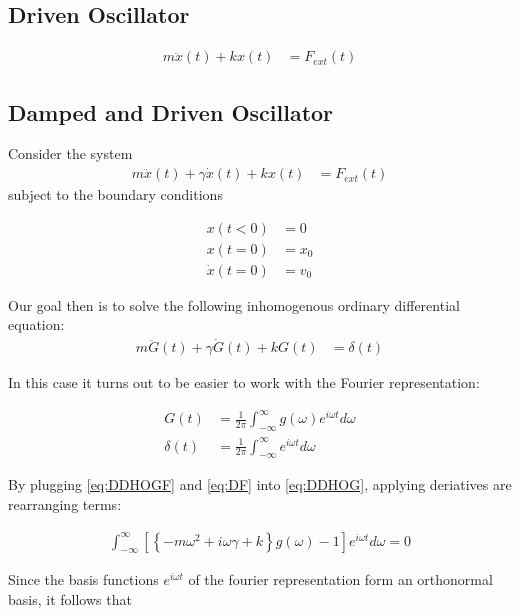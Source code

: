 \documentclass[11pt]{article}
\theoremstyle{plain}
\theoremstyle{definition}
\begin{document}
\subsection{Driven Oscillator}
\begin{align}
    m \ddot x(t) + kx(t) &= F_{ext}(t)
\end{align}


\subsection{Damped and Driven  Oscillator}

Consider the system
\begin{align}
    m \ddot x(t) + \gamma \dot x(t) + kx(t) &= F_{ext}(t) \label{eq:DDHO}
\end{align}
subject to the boundary conditions

\begin{align}
    x(t < 0) &= 0 \\
    x(t=0) &= x_0 \label{eq:X0}\\
    \dot x(t = 0) &= v_0 \label{eq:V0}
\end{align}

Our goal then is to solve the following inhomogenous ordinary differential equation:
\begin{align}
    m \ddot G(t) + \gamma \dot G(t) + kG(t) &= \delta(t) \label{eq:DDHOG}
\end{align}


In this case it turns out to be easier to work with the Fourier representation:

\begin{align}
    G(t) &= \frac{1}{2\pi} \int_{-\infty}^{\infty} g(\omega) e^{i\omega t} d\omega \label{eq:DDHOGF} \\
    \delta(t) &= \frac{1}{2\pi} \int_{-\infty}^{\infty} e^{i\omega t} d\omega \label{eq:DF}
\end{align}

By plugging \eqref{eq:DDHOGF} and \eqref{eq:DF} into \eqref{eq:DDHOG}, applying deriatives are rearranging terms:

\begin{align}
    \int_{-\infty}^{\infty} \left[ \left\{ -m\omega^2 + i\omega \gamma + k \right\}g(\omega) - 1 \right] e^{i\omega t} d\omega = 0
\end{align}

Since the basis functions $e^{i\omega t}$ of the fourier representation form an orthonormal basis, it follows that
\end{document}
